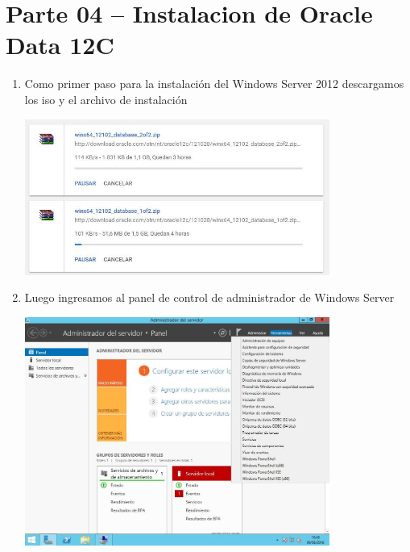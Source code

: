\section{Parte 04 – Instalacion de Oracle Data 12C} 

\begin{enumerate}[1.]
	\item Como primer paso para la instalaci\'on del Windows Server 2012 descargamos los iso y el archivo de instalaci\'on\\
	\begin{center}
	\includegraphics[width=10cm]{./Imagenes/img1} 
	\end{center}

	\item Luego ingresamos al panel de control de administrador de Windows Server\\
	\begin{center}
	\includegraphics[width=10cm]{./Imagenes/img2} 
	\end{center}


\end{enumerate}
